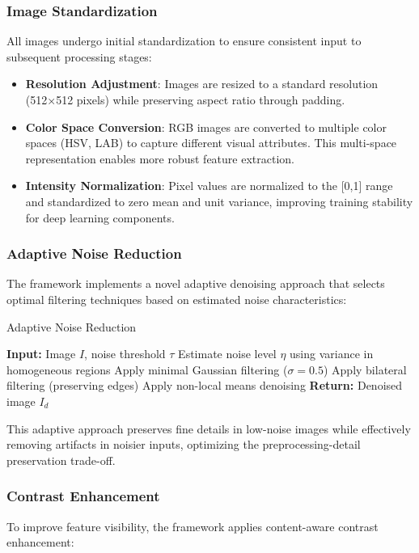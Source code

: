 \subsubsection{Image Standardization}
All images undergo initial standardization to ensure consistent input to subsequent processing stages:

\begin{itemize}
    \item \textbf{Resolution Adjustment}: Images are resized to a standard resolution (512×512 pixels) while preserving aspect ratio through padding.
    
    \item \textbf{Color Space Conversion}: RGB images are converted to multiple color spaces (HSV, LAB) to capture different visual attributes. This multi-space representation enables more robust feature extraction.
    
    \item \textbf{Intensity Normalization}: Pixel values are normalized to the [0,1] range and standardized to zero mean and unit variance, improving training stability for deep learning components.
\end{itemize}

\subsubsection{Adaptive Noise Reduction}
The framework implements a novel adaptive denoising approach that selects optimal filtering techniques based on estimated noise characteristics:

\begin{algorithm}
\caption{Adaptive Noise Reduction}
\begin{algorithmic}[1]
\STATE \textbf{Input:} Image $I$, noise threshold $\tau$
\STATE Estimate noise level $\eta$ using variance in homogeneous regions
    \STATE Apply minimal Gaussian filtering ($\sigma = 0.5$)
    \STATE Apply bilateral filtering (preserving edges)
\ELSE
    \STATE Apply non-local means denoising
\ENDIF
\STATE \textbf{Return:} Denoised image $I_d$
\end{algorithmic}
\end{algorithm}

This adaptive approach preserves fine details in low-noise images while effectively removing artifacts in noisier inputs, optimizing the preprocessing-detail preservation trade-off.

\subsubsection{Contrast Enhancement}
To improve feature visibility, the framework applies content-aware contrast enhancement:

